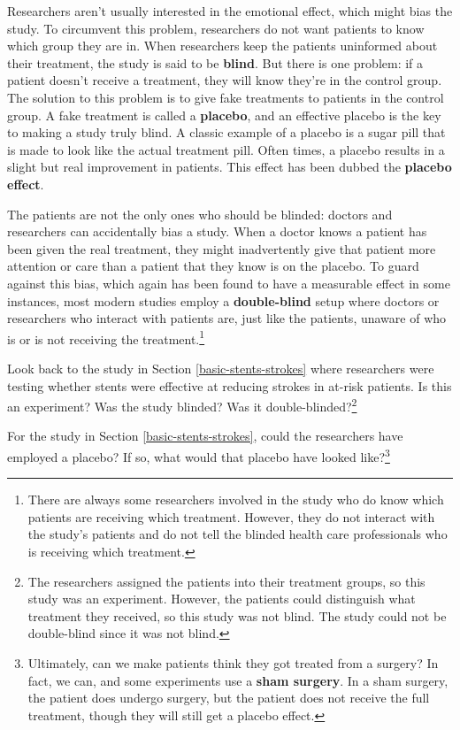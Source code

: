 \documentclass[
  10pt,
  openany]{book}
\theoremstyle{definition}
\theoremstyle{definition}
\theoremstyle{definition}
\theoremstyle{definition}
\theoremstyle{remark}
\begin{document}
Researchers aren't usually interested in the emotional effect, which might bias the study.
To circumvent this problem, researchers do not want patients to know which group they are in.
When researchers keep the patients uninformed about their treatment, the study is said to be \textbf{blind}.
But there is one problem: if a patient doesn't receive a treatment, they will know they're in the control group.
The solution to this problem is to give fake treatments to patients in the control group.
A fake treatment is called a \textbf{placebo}, and an effective placebo is the key to making a study truly blind.
A classic example of a placebo is a sugar pill that is made to look like the actual treatment pill.
Often times, a placebo results in a slight but real improvement in patients.
This effect has been dubbed the \textbf{placebo effect}.

The patients are not the only ones who should be blinded: doctors and researchers can accidentally bias a study.
When a doctor knows a patient has been given the real treatment, they might inadvertently give that patient more attention or care than a patient that they know is on the placebo.
To guard against this bias, which again has been found to have a measurable effect in some instances, most modern studies employ a \textbf{double-blind} setup where doctors or researchers who interact with patients are, just like the patients, unaware of who is or is not receiving the treatment.\footnote{There are always some researchers involved in the study who do know which patients are receiving which treatment. However, they do not interact with the study's patients and do not tell the blinded health care professionals who is receiving which treatment.}

Look back to the study in Section \ref{basic-stents-strokes} where researchers were testing whether stents were effective at reducing strokes in at-risk patients.
Is this an experiment? Was the study blinded? Was it double-blinded?\footnote{The researchers assigned the patients into their treatment groups, so this study was an experiment. However, the patients could distinguish what treatment they received, so this study was not blind. The study could not be double-blind since it was not blind.}

For the study in Section \ref{basic-stents-strokes}, could the researchers have employed a placebo?
If so, what would that placebo have looked like?\footnote{Ultimately, can we make patients think they got treated from a surgery? In fact, we can, and some experiments use a \textbf{sham surgery}. In a sham surgery, the patient does undergo surgery, but the patient does not receive the full treatment, though they will still get a placebo effect.}
\end{document}
